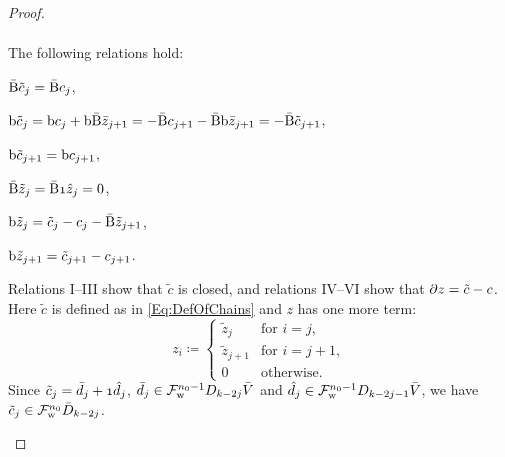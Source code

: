 \documentclass[\MainFolder/Text.tex]{subfiles}
\begin{document}
\begin{proof}
\begin{ProofList}
\begin{align*}
\end{align*}
The following relations hold:
\begin{EqnList}
\item $\bar{\mathrm{B}} \tilde{c}_j = \bar{\mathrm{B}} c_j$,
\item $\mathrm{b} \tilde{c}_j = \mathrm{b} c_j + \mathrm{b} \bar{\mathrm{B}} \bar{z}_{j+1} = - \bar{\mathrm{B}} c_{j+1} - \bar{\mathrm{B}}  \mathrm{b} \bar{z}_{j+1} = - \bar{\mathrm{B}} \tilde{c}_{j+1}$,
\item $\mathrm{b} \tilde{c}_{j+1} = \mathrm{b} c_{j+1}$,
\item $\NCd \tilde{z}_j = \NCd \NOne \hat{z}_j = 0$,
\item $\mathrm{b} \tilde{z}_j = \tilde{c}_j - c_j - \bar{\mathrm{B}} \tilde{z}_{j+1}$,
\item $\mathrm{b} \tilde{z}_{j+1} = \tilde{c}_{j+1} - c_{j+1}$.
\end{EqnList}
Relations I--III show that $\tilde{c}$ is closed, and relations IV--VI show that $\partial z = \tilde{c} - c$. Here $\tilde{c}$ is defined as in \eqref{Eq:DefOfChains} and $z$ has one more term:
$$ z_i \coloneqq \begin{cases} \tilde{z}_j & \text{for } i = j, \\ \tilde{z}_{j+1} & \text{for } i = j+1, \\
0 & \text{otherwise}. \end{cases} $$
Since $\tilde{c}_j = \bar{d}_j + \NOne \hat{d}_j$, $\bar{d}_j\in \mathcal{F}^{n_0-1}_{\mathrm{w}}D_{k-2j}\bar{V}$ and $\hat{d}_j\in \mathcal{F}^{n_0-1}_{\mathrm{w}}D_{k-2j-1}\bar{V}$, we have $\tilde{c}_j \in \mathcal{F}^{n_0}_{\mathrm{w}} \bar{D}_{k-2j}$.


\end{ProofList}
\end{proof}
\end{document}
